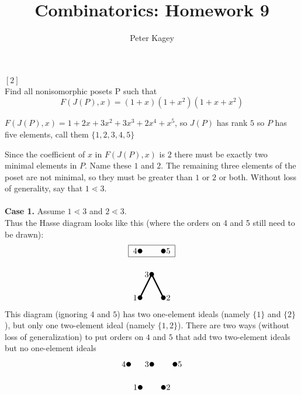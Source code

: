 \documentclass{article}
\newenvironment{problem}[2][Problem]{\begin{trivlist}
\item[\hskip \labelsep {\bfseries #1}\hskip \labelsep {\bfseries #2.}]}{\end{trivlist}}
\newenvironment{solution}[1][Solution.]{\begin{trivlist}
\item[\hskip \labelsep {\bfseries #1}]}{\end{trivlist}}
\newcommand{\set}[1]{\{ #1 \}}
\begin{document}
\title{Combinatorics: Homework 9}
\author{Peter Kagey}

\maketitle

\begin{problem}{34} $[2]$ \\
  Find all nonisomorphic posets P such that \[
    F(J(P), x) = (1 + x)(1 + x^2)(1 + x + x^2)
  \]
\end{problem}

\begin{solution}
  $F(J(P), x) = 1 + 2x + 3x^2 + 3x^3 + 2x^4 + x^5$, so $J(P)$ has rank $5$ so
  $P$ has five elements, call them $\{1,2,3,4,5\}$

  Since the coefficient of $x$ in $F(J(P), x)$ is $2$ there must be
  exactly two minimal elements in $P$. Name these $1$ and $2$. The
  remaining three elements of the poset are not minimal, so they must be greater
  than $1$ or $2$ or both.
  Without loss of generality, say that $1 \lessdot 3$.
  \\~\\
  \textbf{Case 1.} Assume $1 \lessdot 3$ and $2 \lessdot 3$.\\
  Thus the Hasse diagram looks like this (where the orders on 4 and 5 still
  need to be drawn): \[
    \begin{tikzpicture}
      \fill (0,0) circle (0.1) node[left] {1};
      \fill (1/2,1) circle (0.1) node[left] {3};
      \draw[ultra thick] (0,0)--(1/2,1);

      \fill (1,0) circle (0.1) node[right] {2};
      \draw[ultra thick] (1,0)--(1/2,1);

      \draw (-1/2,7/4) rectangle (3/2, 9/4);
      \fill (0,2) circle (0.1) node[left] {4};
      \fill (1,2) circle (0.1) node[right] {5};
    \end{tikzpicture}
  \]
  This diagram (ignoring $4$ and $5$) has
  two one-element ideals (namely $\set 1$ and $\set 2$),
  but only one two-element ideal (namely $\set{1,2}$). There are two ways
  (without loss of generalization) to
  put orders on $4$ and $5$ that add two two-element ideals but no one-element
  ideals \[
    \begin{tikzpicture}
      \fill (0,0) circle (0.1) node[left] {1};
      \fill (1,0) circle (0.1) node[right] {2};
      \fill (1/2,1) circle (0.1) node[left] {3};
      \fill (-1/2,1) circle (0.1) node[left] {4};
      \fill (3/2,1) circle (0.1) node[right] {5};


\end{tikzpicture}\]
\end{solution}
\end{document}
